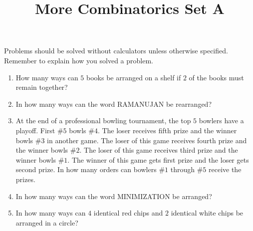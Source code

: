\documentclass{article}
\title{More Combinatorics Set A}
\date{}
\author{}
\begin{document}
    \maketitle
    \noindent Problems should be solved without calculators unless otherwise specified.
    Remember to explain how you solved a problem.
    \begin{enumerate}
        \item How many ways can $5$ books be arranged on a shelf if $2$ of the books must 
        remain together?
        \vspace{3cm}
        \item In how many ways can the word RAMANUJAN be rearranged?
        \vspace{3cm}
        \item At the end of a professional bowling tournament, the top $5$ bowlers have a 
        playoff. First \#$5$ bowls \#$4$. The loser receives fifth prize and the winner 
        bowls \#$3$ in another game. The loser of this game receives fourth prize and the 
        winner bowls \#$2$. The loser of this game receives third prize and the winner bowls 
        \#$1$. The winner of this game gets first prize and the loser gets second prize. 
        In how many orders can bowlers \#$1$ through \#$5$ receive the prizes.
        \vspace{3cm}
        \item In how many ways can the word MINIMIZATION be arranged?
        \vspace{3cm}
        \item In how many ways can $4$ identical red chips and $2$ identical white chips be 
        arranged in a circle?
        \vspace{3cm}
    \end{enumerate}
\end{document}
